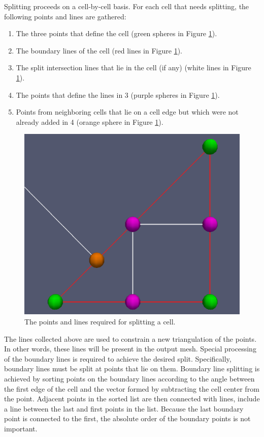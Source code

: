 \documentclass{InsightArticle}
\begin{document}
Splitting proceeds on a cell-by-cell basis. For each cell that needs splitting, the following points and lines are gathered:

\begin{enumerate}
\item The three points that define the cell (green spheres in Figure \ref{fig:CellSplitSetup}).
\item The boundary lines of the cell (red lines in Figure \ref{fig:CellSplitSetup}).
\item The split intersection lines that lie in the cell (if any) (white lines in Figure \ref{fig:CellSplitSetup}).
\item The points that define the lines in 3 (purple spheres in Figure \ref{fig:CellSplitSetup}).
\item Points from neighboring cells that lie on a cell edge but which were not already added in 4 (orange sphere in Figure \ref{fig:CellSplitSetup}).
\end{enumerate}

\begin{figure}[h]
\centering
\includegraphics[scale=0.25]{Figures/CellSplitSetup}
\caption{The points and lines required for splitting a cell.}
\label{fig:CellSplitSetup}
\end{figure}

The lines collected above are used to constrain a new triangulation of the points. In other words, these lines will be present in the output mesh. Special processing of the boundary lines is required to achieve the desired split. Specifically, boundary lines must be split at points that lie on them. Boundary line splitting is achieved by sorting points on the boundary lines according to the angle between the first edge of the cell and the vector formed by subtracting the cell center from the point. Adjacent points in the sorted list are then connected with lines, include a line between the last and first points in the list. Because the last boundary point is connected to the first, the absolute order of the boundary points is not important.
\end{document}
